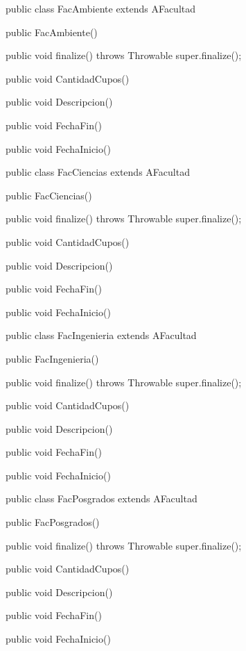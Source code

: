 public class FacAmbiente extends AFacultad {

public FacAmbiente(){

}

public void finalize() throws Throwable {
super.finalize();
}

public void CantidadCupos(){

}

public void Descripcion(){

}

public void FechaFin(){

}

public void FechaInicio(){

}

}



public class FacCiencias extends AFacultad {

public FacCiencias(){

}

public void finalize() throws Throwable {
super.finalize();
}

public void CantidadCupos(){

}

public void Descripcion(){

}

public void FechaFin(){

}

public void FechaInicio(){

}

}


public class FacIngenieria extends AFacultad {

public FacIngenieria(){

}

public void finalize() throws Throwable {
super.finalize();
}

public void CantidadCupos(){

}

public void Descripcion(){

}

public void FechaFin(){

}

public void FechaInicio(){

}

}


public class FacPosgrados extends AFacultad {

public FacPosgrados(){

}

public void finalize() throws Throwable {
super.finalize();
}

public void CantidadCupos(){

}

public void Descripcion(){

}

public void FechaFin(){

}

public void FechaInicio(){

}

}

